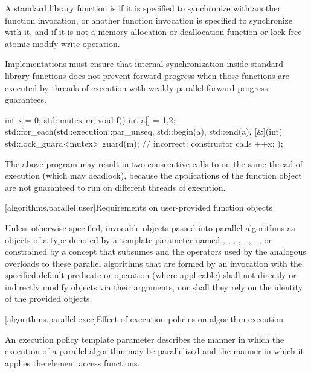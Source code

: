 \pnum
A standard library function is 
if it is specified to synchronize with another function invocation, or
another function invocation is specified to synchronize with it,
and if it is not a memory allocation or deallocation function
or lock-free atomic modify-write operation.
\begin{note}
Implementations must ensure that internal synchronization
inside standard library functions does not prevent forward progress
when those functions are executed by threads of execution
with weakly parallel forward progress guarantees.
\end{note}
\begin{example}
\begin{codeblock}
int x = 0;
std::mutex m;
void f() {
  int a[] = {1,2};
  std::for_each(std::execution::par_unseq, std::begin(a), std::end(a), [&](int) {
    std::lock_guard<mutex> guard(m);            // incorrect:  constructor calls 
    ++x;
  });
}
\end{codeblock}
The above program may result in two consecutive calls to 
on the same thread of execution (which may deadlock),
because the applications of the function object are not guaranteed
to run on different threads of execution.
\end{example}

[algorithms.parallel.user]{Requirements on user-provided function objects}

\pnum
Unless otherwise specified,
invocable objects passed into parallel algorithms as objects of a type
denoted by a template parameter named
,
,
,
,
,
,
,
, or
constrained by a concept that subsumes 
and the operators used by the analogous overloads to these parallel algorithms
that are formed by an invocation
with the specified default predicate or operation (where applicable)
shall not directly or indirectly modify objects via their arguments,
nor shall they rely on the identity of the provided objects.

[algorithms.parallel.exec]{Effect of execution policies on algorithm execution}

\pnum
An execution policy template parameter describes
the manner in which the execution of a parallel algorithm may be
parallelized and the manner in which it applies the element access functions.


